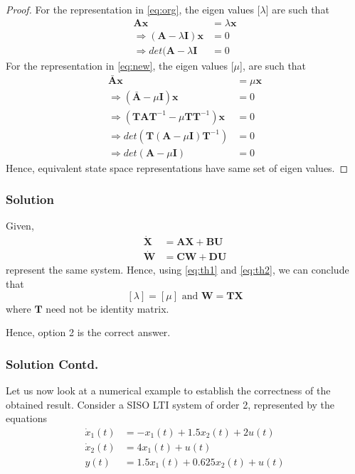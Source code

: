 \documentclass{beamer}
\renewcommand{\vec}[1]{\mathbf{#1}}
\begin{document}
\begin{frame}
\frametitle{}
\begin{proof}
For the representation in \eqref{eq:org}, the eigen values [$\lambda$] are such that
\begin{align}
    \vec{A}\vec{x}&=\lambda \vec{x}\\
    \Rightarrow(\vec{A}-\lambda \vec{I})\vec{x}&=0\\
    \Rightarrow det(\vec{A}-\lambda \vec{I}&=0
\end{align}
For the representation in \eqref{eq:new}, the eigen values [$\mu$], are such that
\begin{align}
    \vec{\bar A}\vec{x}&=\mu \vec{x}\\
    \Rightarrow(\vec{\bar A}-\mu \vec{I})\vec{x}&=0\\
    \Rightarrow(\vec{T}\vec{A}\vec{T}^{-1}-\mu \vec{T}\vec{T}^{-1})\vec{x}&=0\\
    \Rightarrow det(\vec{T}(\vec{A}-\mu \vec{I})\vec{T}^{-1})&=0\\
    \Rightarrow det(\vec{A}-\mu \vec{I})&=0
\end{align}
Hence, equivalent state space representations have same set of eigen values.
\end{proof}
\end{frame}

\begin{frame}
\frametitle{Solution}
Given,
\begin{align}
    \vec{\dot X}&=\vec{A}\vec{X}+\vec{B}\vec{U}\\
    \vec{\dot W}&=\vec{C}\vec{W}+\vec{D}\vec{U}
\end{align}
represent the same system. Hence, using \eqref{eq:th1} and \eqref{eq:th2}, we can conclude that
$$[\lambda]=[\mu] \text{ and } \vec{W}=\vec{T}\vec{X}$$
where $\vec{T}$ need not be identity matrix.


Hence, option 2 is the correct answer.
\end{frame}

\begin{frame}
\frametitle{Solution Contd.}
Let us now look at a numerical example to establish the correctness of the obtained result. Consider a SISO LTI system of order 2, represented by the equations
\begin{align}
    \dot x_1(t)&=-x_1(t)+1.5x_2(t)+2u(t)\\
    \dot x_2(t)&=4x_1(t)+u(t)\\
    y(t)&=1.5x_1(t)+0.625x_2(t)+u(t)
\end{align}
\end{frame}
\end{document}
